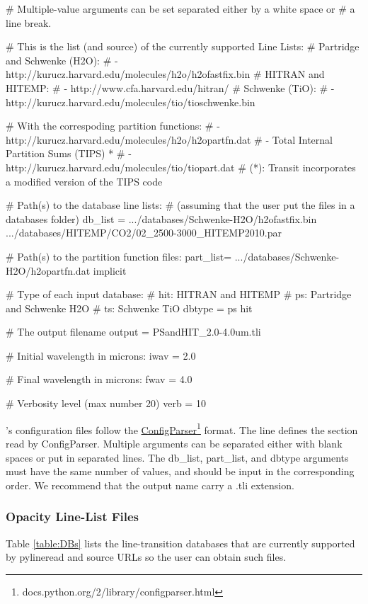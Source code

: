 \documentclass[letterpaper, 12pt]{article}
\begin{document}
\begin{plain}
[Parameters]
# Multiple-value arguments can be set separated either by a white space or
# a line break.

# This is the list (and source) of the currently supported Line Lists:
# Partridge and Schwenke (H2O):
#   - http://kurucz.harvard.edu/molecules/h2o/h2ofastfix.bin
# HITRAN and HITEMP:
#   - http://www.cfa.harvard.edu/hitran/
# Schwenke (TiO):
#   - http://kurucz.harvard.edu/molecules/tio/tioschwenke.bin

# With the correspoding partition functions:
#   - http://kurucz.harvard.edu/molecules/h2o/h2opartfn.dat
#   - Total Internal Partition Sums (TIPS) *
#   - http://kurucz.harvard.edu/molecules/tio/tiopart.dat
# (*): Transit incorporates a modified version of the TIPS code

# Path(s) to the database line lists:
# (assuming that the user put the files in a databases folder)
db_list  = .../databases/Schwenke-H2O/h2ofastfix.bin
           .../databases/HITEMP/CO2/02_2500-3000_HITEMP2010.par

# Path(s) to the partition function files:
part_list= .../databases/Schwenke-H2O/h2opartfn.dat
           implicit

# Type of each input database:
#   hit:  HITRAN and HITEMP
#   ps:   Partridge and Schwenke H2O
#   ts:   Schwenke TiO
dbtype   = ps hit

# The output filename
output   = PSandHIT_2.0-4.0um.tli

# Initial wavelength in microns:
iwav     = 2.0

# Final wavelength in microns:
fwav     = 4.0

# Verbosity level (max number 20)
verb     = 10
\end{plain} 
\vspace{10pt}

{\pylineread}'s configuration files follow the
\href{https://docs.python.org/2/library/configparser.html}
{ConfigParser}\footnote{docs.python.org/2/library/configparser.html}
format.  The {\tttm[Parameters]} line defines the section read by
ConfigParser.  Multiple arguments can be separated either with blank
spaces or put in separated lines.  The db\_list, part\_list, and
dbtype arguments must have the same number of values, and should be
input in the corresponding order.  We recommend that the output name
carry a {\tttm .tli} extension.

\subsubsection{Opacity Line-List Files}
Table \ref{table:DBs} lists the line-transition databases that are
currently supported by pylineread and source URLs so the user can
obtain such files.
\end{document}
